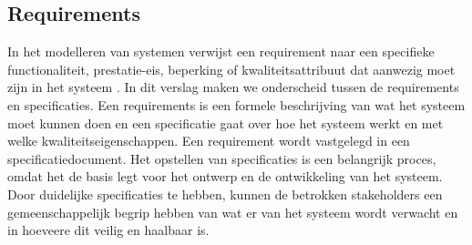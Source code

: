 \documentclass{article}
\begin{document}
	

	
	
	
	
	
	\subsection{Requirements}
	In het modelleren van systemen verwijst een requirement naar een specifieke functionaliteit, prestatie-eis, beperking of kwaliteitsattribuut dat aanwezig moet zijn in het systeem \cite{kotonya1998requirements}. In dit verslag maken we onderscheid tussen de requirements en specificaties. Een requirements is een formele beschrijving van wat het systeem moet kunnen doen en een specificatie gaat over hoe het systeem werkt en met welke kwaliteitseigenschappen. Een requirement wordt vastgelegd in een specificatiedocument.
	Het opstellen van specificaties\cite{kotonya1998requirements} is een belangrijk proces, omdat het de basis legt voor het ontwerp en de ontwikkeling van het systeem. Door duidelijke specificaties te hebben, kunnen de betrokken stakeholders een gemeenschappelijk begrip hebben van wat er van het systeem wordt verwacht en in hoeveere dit veilig en haalbaar is.
 
	
	
%	
%	
	
\end{document}

